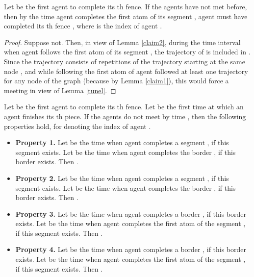 \documentclass [11pt] {article}
\begin{document}
{
\begin{lemma}
\label{claim3}
Let  be the first agent to complete its th fence. If the agents have not met before, then by the time agent  completes the first atom of its segment , agent  must have completed its th fence , where  is the index of agent .
\end{lemma}}
{
\begin{proof}
Suppose not. Then, in view of Lemma \ref{claim2}, during the time interval when agent  follows the first atom of its segment , the trajectory of  is included in . Since the trajectory  consists of repetitions of the trajectory  starting at the same node , and while following the first atom of  agent  followed at least one trajectory  for any node  of the graph (because  by Lemma \ref{claim1}), this would force a meeting in view of Lemma \ref{tunel}.
\end{proof}}

\begin{lemma}
\label{lem:four}
Let  be the first agent to complete its th fence. {Let  be the first time at which an agent finishes its th piece. If the agents do not meet by time , then
the following properties hold, for  denoting the index of agent }.
\begin{itemize}
\item {\bf Property 1.} Let  be the time when agent  completes 
a segment , if this segment exists. Let  be the time when agent  completes 
the border , if this border exists. Then .
\item {\bf Property 2.} Let  be the time when agent  completes a segment , if this segment exists.
Let  be the time when agent  completes 
the border , if this border exists. Then .
\item {\bf Property 3.}
 Let  be the time when agent  completes 
a border , if this border exists. Let  be the time when agent  completes 
the first atom of the segment , if this segment exists. Then .
 \item {\bf Property 4.}
Let  be the time when agent  completes a border , if this border exists.
Let  be the time when agent  completes 
the first atom of the segment , if this segment exists. Then . 
\end{itemize}
\end{lemma}
\end{document}
